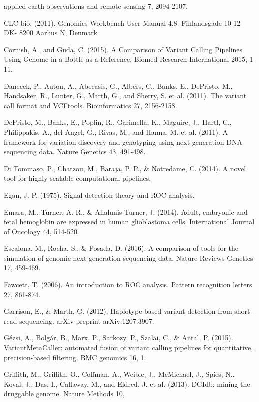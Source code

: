 \documentclass{article}
\begin{document}
\begin{list}{}{%
\setlength{\topsep}{0pt}%
\setlength{\leftmargin}{0.5in}%
\setlength{\listparindent}{-0.5in}%
\setlength{\itemindent}{-0.5in}%
\setlength{\parsep}{\parskip}%
}
applied earth observations and remote sensing 7, 2094-2107. \\\item[] CLC bio. (2011). Genomics Workbench User Manual 4.8. Finlandsgade 10-12 DK- 8200 Aarhus N, Denmark\\\item[] Cornish, A., and Guda, C. (2015). A Comparison of Variant Calling Pipelines Using Genome in a Bottle as a Reference. Biomed Research International 2015, 1-11.\\\item[] Danecek, P., Auton, A., Abecasis, G., Albers, C., Banks, E., DePristo, M., Handsaker, R., Lunter, G., Marth, G., and Sherry, S. et al. (2011). The variant call format and VCFtools. Bioinformatics 27, 2156-2158.\\\item[] DePristo, M., Banks, E., Poplin, R., Garimella, K., Maguire, J., Hartl, C., Philippakis, A., del Angel, G., Rivas, M., and Hanna, M. et al. (2011). A framework for variation discovery and genotyping using next-generation DNA sequencing data. Nature Genetics 43, 491-498.\\\item[] Di Tommaso, P., Chatzou, M., Baraja, P. P., \& Notredame, C. (2014). A novel tool for highly scalable computational pipelines.\\\item[] Egan, J. P. (1975). Signal detection theory and ROC analysis.\\\item[] Emara, M., Turner, A. R., \& Allalunis-Turner, J. (2014). Adult, embryonic and fetal hemoglobin are expressed in human glioblastoma cells. International Journal of Oncology 44, 514-520.\\\item[] Escalona, M., Rocha, S., \& Posada, D. (2016). A comparison of tools for the simulation of genomic next-generation sequencing data. Nature Reviews Genetics 17, 459-469.\\\item[] Fawcett, T. (2006). An introduction to ROC analysis. Pattern recognition letters 27, 861-874.\\\item[] Garrison, E., \& Marth, G. (2012). Haplotype-based variant detection from short-read sequencing. arXiv preprint arXiv:1207.3907.\\\item[] Gézsi, A., Bolgár, B., Marx, P., Sarkozy, P., Szalai, C., \& Antal, P. (2015). VariantMetaCaller: automated fusion of variant calling pipelines for quantitative, precision-based filtering. BMC genomics 16, 1.\\\item[] Griffith, M., Griffith, O., Coffman, A., Weible, J., McMichael, J., Spies, N., Koval, J., Das, I., Callaway, M., and Eldred, J. et al. (2013). DGIdb: mining the druggable genome. Nature Methods 10, 
\end{list}
\end{document}
